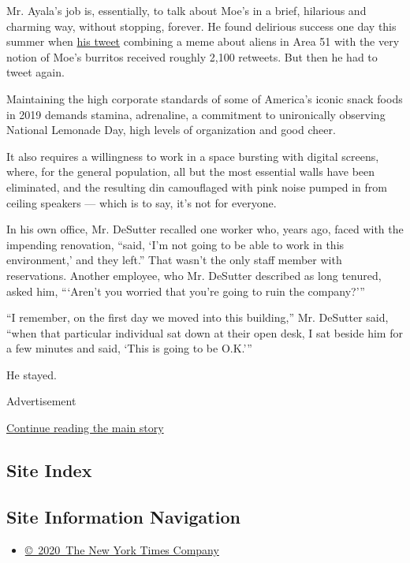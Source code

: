 Mr. Ayala's job is, essentially, to talk about Moe's in a brief,
hilarious and charming way, without stopping, forever. He found
delirious success one day this summer when
\href{https://twitter.com/Moes_HQ/status/1150800074835972096}{his tweet}
combining a meme about aliens in Area 51 with the very notion of Moe's
burritos received roughly 2,100 retweets. But then he had to tweet
again.

Maintaining the high corporate standards of some of America's iconic
snack foods in 2019 demands stamina, adrenaline, a commitment to
unironically observing National Lemonade Day, high levels of
organization and good cheer.

It also requires a willingness to work in a space bursting with digital
screens, where, for the general population, all but the most essential
walls have been eliminated, and the resulting din camouflaged with pink
noise pumped in from ceiling speakers --- which is to say, it's not for
everyone.

In his own office, Mr. DeSutter recalled one worker who, years ago,
faced with the impending renovation, ``said, `I'm not going to be able
to work in this environment,' and they left.'' That wasn't the only
staff member with reservations. Another employee, who Mr. DeSutter
described as long tenured, asked him, ```Aren't you worried that you're
going to ruin the company?'''

``I remember, on the first day we moved into this building,'' Mr.
DeSutter said, ``when that particular individual sat down at their open
desk, I sat beside him for a few minutes and said, `This is going to be
O.K.'''

He stayed.

Advertisement

\protect\hyperlink{after-bottom}{Continue reading the main story}

\hypertarget{site-index}{%
\subsection{Site Index}\label{site-index}}

\hypertarget{site-information-navigation}{%
\subsection{Site Information
Navigation}\label{site-information-navigation}}

\begin{itemize}
\tightlist
\item
  \href{https://help.nytimes3xbfgragh.onion/hc/en-us/articles/115014792127-Copyright-notice}{©~2020~The
  New York Times Company}
\end{itemize}

